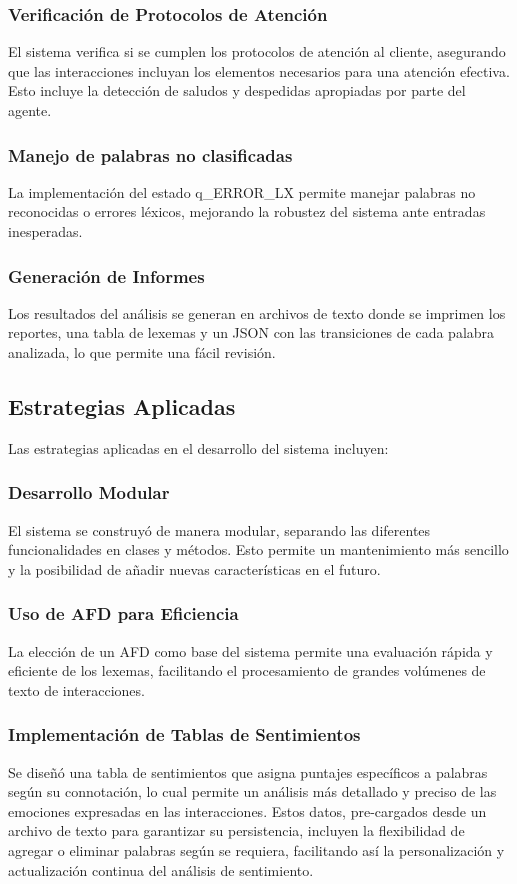\documentclass[12pt,a4paper]{article}
\begin{document}
\subsubsection{Verificación de Protocolos de Atención}
El sistema verifica si se cumplen los protocolos de atención al cliente, asegurando que las interacciones incluyan los elementos necesarios para una atención efectiva. Esto incluye la detección de saludos y despedidas apropiadas por parte del agente.
\subsubsection{Manejo de palabras no clasificadas}
La implementación del estado q\_ERROR\_LX permite manejar palabras no reconocidas o errores léxicos, mejorando la robustez del sistema ante entradas inesperadas.
\subsubsection{Generación de Informes}
Los resultados del análisis se generan en archivos de texto donde se imprimen los reportes, una tabla de lexemas y un JSON con las transiciones de cada palabra analizada, lo que permite una fácil revisión.

\subsection{Estrategias Aplicadas}
Las estrategias aplicadas en el desarrollo del sistema incluyen:

\subsubsection{Desarrollo Modular}
El sistema se construyó de manera modular, separando las diferentes funcionalidades en clases y métodos. Esto permite un mantenimiento más sencillo y la posibilidad de añadir nuevas características en el futuro.
\subsubsection{Uso de AFD para Eficiencia}
La elección de un AFD como base del sistema permite una evaluación rápida y eficiente de los lexemas, facilitando el procesamiento de grandes volúmenes de texto de interacciones.

\subsubsection{Implementación de Tablas de Sentimientos}
Se diseñó una tabla de sentimientos que asigna puntajes específicos a palabras según su connotación, lo cual permite un análisis más detallado y preciso de las emociones expresadas en las interacciones. Estos datos, pre-cargados desde un archivo de texto para garantizar su persistencia, incluyen la flexibilidad de agregar o eliminar palabras según se requiera, facilitando así la personalización y actualización continua del análisis de sentimiento.
\end{document}
